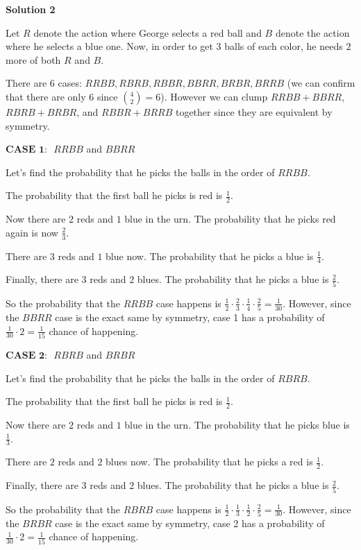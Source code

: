 \begin{enumerate}
\textbf{Solution 2}

Let $R$ denote the action where George selects a red ball and $B$ denote the action where he selects a blue one. Now, in order to get $3$ balls of each color, he needs $2$ more of both $R$ and $B$.

 There are 6 cases: $RRBB, RBRB, RBBR, BBRR, BRBR, BRRB$ (we can confirm that there are only $6$ since $\binom{4}{2}=6$). However we can clump $RRBB + BBRR$, $RBRB + BRBR$, and $RBBR + BRRB$ together since they are equivalent by symmetry.

 
$\textbf{CASE 1: }$ $RRBB$ and $BBRR$

 Let's find the probability that he picks the balls in the order of $RRBB$. 

 The probability that the first ball he picks is red is $\frac{1}{2}$. 

 Now there are $2$ reds and $1$ blue in the urn. The probability that he picks red again is now $\frac{2}{3}$.

 There are $3$ reds and $1$ blue now. The probability that he picks a blue is $\frac{1}{4}$. 

 Finally, there are $3$ reds and $2$ blues. The probability that he picks a blue is $\frac{2}{5}$.

 So the probability that the $RRBB$ case happens is $\frac{1}{2} \cdot \frac{2}{3} \cdot \frac{1}{4} \cdot \frac{2}{5} = \frac{1}{30}$. However, since the $BBRR$ case is the exact same by symmetry, case 1 has a probability of $\frac{1}{30} \cdot 2 = \frac{1}{15}$ chance of happening.

 
$\textbf{CASE 2: }$ $RBRB$ and $BRBR$

 Let's find the probability that he picks the balls in the order of $RBRB$. 

 The probability that the first ball he picks is red is $\frac{1}{2}$. 

 Now there are $2$ reds and $1$ blue in the urn. The probability that he picks blue is $\frac{1}{3}$.

 There are $2$ reds and $2$ blues now. The probability that he picks a red is $\frac{1}{2}$. 

 Finally, there are $3$ reds and $2$ blues. The probability that he picks a blue is $\frac{2}{5}$.

 So the probability that the $RBRB$ case happens is $\frac{1}{2} \cdot \frac{1}{3} \cdot \frac{1}{2} \cdot \frac{2}{5} = \frac{1}{30}$. However, since the $BRBR$ case is the exact same by symmetry, case 2 has a probability of $\frac{1}{30} \cdot 2 = \frac{1}{15}$ chance of happening.


\end{enumerate}
